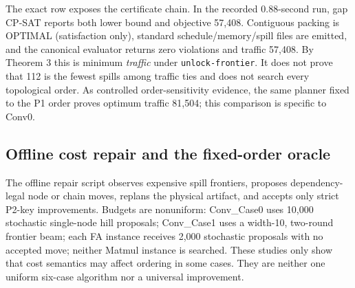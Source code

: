 \begin{table}[H]
\centering
\caption{Conv\_Case0 method path. The exact row proves traffic optimality only for fixed \texttt{unlock-frontier}.}
\label{tab:supp-conv0-path}
\end{table}

The exact row exposes the certificate chain. In the recorded 0.88-second run, gap CP-SAT reports both lower bound and objective 57,408. Contiguous packing is OPTIMAL (satisfaction only), standard schedule/memory/spill files are emitted, and the canonical evaluator returns zero violations and traffic 57,408. By Theorem 3 this is minimum \emph{traffic} under \texttt{unlock-frontier}. It does not prove that 112 is the fewest spills among traffic ties and does not search every topological order. As controlled order-sensitivity evidence, the same planner fixed to the P1 order proves optimum traffic 81,504; this comparison is specific to Conv0.

\subsection{Offline cost repair and the fixed-order oracle}

The offline repair script observes expensive spill frontiers, proposes dependency-legal node or chain moves, replans the physical artifact, and accepts only strict P2-key improvements. Budgets are nonuniform: Conv\_Case0 uses 10,000 stochastic single-node hill proposals; Conv\_Case1 uses a width-10, two-round frontier beam; each FA instance receives 2,000 stochastic proposals with no accepted move; neither Matmul instance is searched. These studies only show that cost semantics may affect ordering in some cases. They are neither one uniform six-case algorithm nor a universal improvement.

